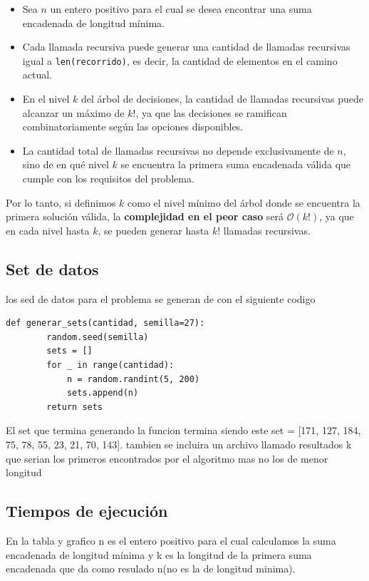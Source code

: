 \documentclass[a4paper, 12pt]{article}
\begin{document}
\begin{itemize}
  \item Sea $n$ un entero positivo para el cual se desea encontrar una suma encadenada de longitud mínima.
  \item Cada llamada recursiva puede generar una cantidad de llamadas recursivas igual a \texttt{len(recorrido)}, es decir, la cantidad de elementos en el camino actual.
  \item En el nivel $k$ del árbol de decisiones, la cantidad de llamadas recursivas puede alcanzar un máximo de $k!$, ya que las decisiones se ramifican combinatoriamente según las opciones disponibles.
  \item La cantidad total de llamadas recursivas no depende exclusivamente de $n$, sino de en qué nivel $k$ se encuentra la primera suma encadenada válida que cumple con los requisitos del problema.
\end{itemize}

\noindent Por lo tanto, si definimos $k$ como el nivel mínimo del árbol donde se encuentra la primera solución válida, la \textbf{complejidad en el peor caso} será $\mathcal{O}(k!)$, ya que en cada nivel hasta $k$, se pueden generar hasta $k!$ llamadas recursivas.

    
\subsection{Set de datos}
los sed de datos para el problema se generan de con el siguiente codigo 
	\begin{lstlisting}[frame=single]
		def generar_sets(cantidad, semilla=27):
		random.seed(semilla)
		sets = []
		for _ in range(cantidad):
			n = random.randint(5, 200)
			sets.append(n)
		return sets	
	\end{lstlisting}

    El set que termina generando la funcion termina siendo este set = [171, 127, 184, 75, 78, 55, 23, 21, 70, 143]. tambien se incluira un archivo llamado resultados k que serian los primeros encontrados por el algoritmo mas no los de menor longitud
	
\subsection{Tiempos de ejecución}
    En la tabla y grafico n es el entero positivo para el cual calculamos la suma encadenada de longitud mínima y k es la longitud de la primera suma encadenada que da como resulado n(no es la de longitud minima).\newline
    
\end{document}
